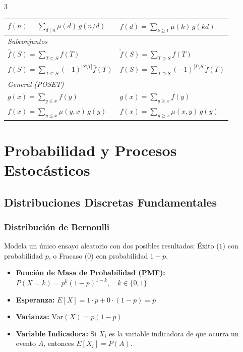 \documentclass[8pt, spanish, mexico, letterpaper]{extarticle}
\newcommand{\<}{<}
\begin{document}
\begin{multicols*}{3}
\begin{center}
\begin{tabular}{ll}
  $f(n)=\displaystyle\sum_{d\mid n}\mu(d)\,g(n/d)$
  & $f(d)=\displaystyle\sum_{k\ge1}\mu(k)\,g(kd)$ \\
  \hline 
  \textit{Subconjuntos} \\ 
  $\hat f(S)=\displaystyle\sum_{T\subseteq S}f(T)$
  & $\check f(S)=\displaystyle\sum_{T\supseteq S}f(T)$ \\
  $f(S)=\displaystyle\sum_{T\subseteq S}(-1)^{|S\setminus T|}\hat f(T)$
  & $f(S)=\displaystyle\sum_{T\supseteq S}(-1)^{|T\setminus S|}\check f(T)$ \\
  \hline 
  \textit{General (POSET)}  \\ 
  $g(x)=\displaystyle\sum_{y\le x}f(y)$
  & $g(x)=\displaystyle\sum_{y\ge x}f(y)$ \\
  $f(x)=\displaystyle\sum_{y\le x}\mu(y,x)\,g(y)$
  & $f(x)=\displaystyle\sum_{y\ge x}\mu(x,y)\,g(y)$ \\
\hline
\end{tabular}
\end{center}
\section{Probabilidad y Procesos Estocásticos}


\subsection{Distribuciones Discretas Fundamentales}

\subsubsection{Distribución de Bernoulli}
Modela un único ensayo aleatorio con dos posibles resultados: Éxito ($1$) con probabilidad $p$, o Fracaso ($0$) con probabilidad $1-p$.
\begin{itemize}
    \item \textbf{Función de Masa de Probabilidad (PMF):} $P(X = k) = p^k (1-p)^{1-k}, \quad k \in \{0, 1\}$
    \item \textbf{Esperanza:} $E[X] = 1 \cdot p + 0 \cdot (1-p) = p$
    \item \textbf{Varianza:} $\text{Var}(X) = p(1-p)$
    \item \textbf{Variable Indicadora:} Si $X_i$ es la variable indicadora de que ocurra un evento $A$, entonces $E[X_i] = P(A)$.
\end{itemize}


\end{multicols*}
\end{document}
